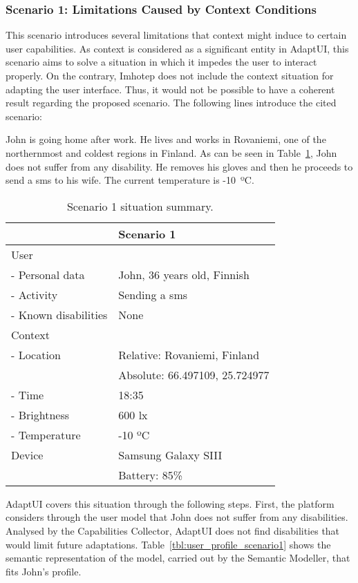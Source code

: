 \subsubsection{Scenario 1: Limitations Caused by Context Conditions}
\label{sec:scenario1}

This scenario introduces several limitations that context might induce to 
certain user capabilities. As context is considered as a significant entity in 
AdaptUI, this scenario aims to solve a situation in which it impedes the user to
interact properly. On the contrary, Imhotep does not include the context 
situation for adapting the user interface. Thus, it would not be possible to 
have a coherent result regarding the proposed scenario. The following 
lines introduce the cited scenario:

John is going home after work. He lives and works in Rovaniemi, one of the
northernmost and coldest regions in Finland. As can be seen in 
Table~\ref{tbl:scenario1}, John does not suffer from any disability. He removes
his gloves and then he proceeds to send a \ac{sms} to his wife. The current 
temperature is -10~ºC.

\begin{table}
 \caption{Scenario 1 situation summary.}
 \label{tbl:scenario1}
 \footnotesize
 \centering
\begin{tabular}{l l}
  \hline 
				& \textbf{Scenario 1} 		\\
  \hline
  User \\
  \qquad - Personal data 	& John, 36 years old, Finnish 	\\
  \qquad - Activity	 	& Sending a \ac{sms}		 	\\
  \qquad - Known disabilities 	& None			 	\\
  Context \\
  \qquad - Location 		& Relative: Rovaniemi, Finland	\\
				& Absolute: 66.497109, 25.724977\\
  \qquad - Time			& 18:35				\\
  \qquad - Brightness		& 600 \ac{lx}			\\
  \qquad - Temperature		& -10 ºC			\\
  Device 			& Samsung Galaxy SIII		\\
				& Battery: 85\%			\\
  \hline
\end{tabular}
\end{table}

AdaptUI covers this situation through the following steps. First, the platform
considers through the user model that John does not suffer from any 
disabilities. Analysed by the Capabilities Collector, AdaptUI does not find 
disabilities that would limit future adaptations. 
Table~\ref{tbl:user_profile_scenario1} shows the semantic representation of the 
model, carried out by the Semantic Modeller, that fits John’s profile. 

